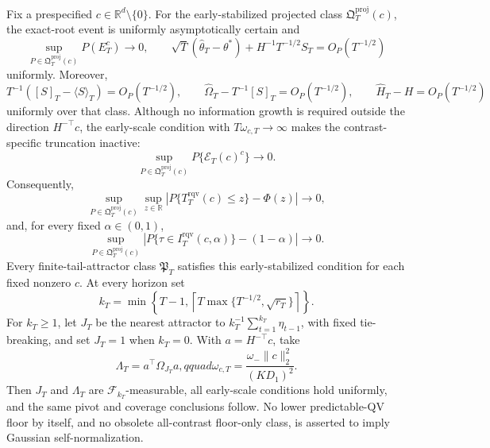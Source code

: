 Fix a prespecified \(c\in\mathbb R^d\setminus\{0\}\). For the early-stabilized projected class \(\mathfrak Q_T^{\mathrm{proj}}(c)\), the exact-root event is uniformly asymptotically certain and
\[
 \sup_{P\in\mathfrak Q_T^{\mathrm{proj}}(c)}P(E_T^c)\longrightarrow0,
 \qquad
 \sqrt T(\widehat\theta_T-\theta^*)+H^{-1}T^{-1/2}S_T
 =O_P(T^{-1/2})
\]
uniformly. Moreover,
\[
 T^{-1}([S]_T-\langle S\rangle_T)=O_P(T^{-1/2}),\qquad
 \widehat\Omega_T-T^{-1}[S]_T=O_P(T^{-1/2}),\qquad
 \widehat H_T-H=O_P(T^{-1/2})
\]
uniformly over that class. Although no information growth is required outside the direction \(H^{-\top}c\), the early-scale condition with \(T\omega_{c,T}\to\infty\) makes the contrast-specific truncation inactive:
\[
 \sup_{P\in\mathfrak Q_T^{\mathrm{proj}}(c)}P\{\mathcal E_T(c)^c\}
 \longrightarrow0.
\]
Consequently,
\[
 \sup_{P\in\mathfrak Q_T^{\mathrm{proj}}(c)}\sup_{z\in\mathbb R}
 \left|P\{T_T^{\mathrm{rqv}}(c)\le z\}-\Phi(z)\right|
 \longrightarrow0,
\]
and, for every fixed \(\alpha\in(0,1)\),
\[
 \sup_{P\in\mathfrak Q_T^{\mathrm{proj}}(c)}
 \left|P\{\tau\in I_T^{\mathrm{rqv}}(c,\alpha)\}-(1-\alpha)\right|
 \longrightarrow0.
\]
Every finite-tail-attractor class \(\mathfrak P_T\) satisfies this early-stabilized condition for each fixed nonzero \(c\). At every horizon set
\[
 k_T=\min\!\left\{T-1,\left\lceil T\max\{T^{-1/2},\sqrt{r_T}\}\right\rceil\right\}.
\]
For \(k_T\ge1\), let \(J_T\) be the nearest attractor to \(k_T^{-1}\sum_{t=1}^{k_T}\eta_{t-1}\), with fixed tie-breaking, and set \(J_T=1\) when \(k_T=0\). With \(a=H^{-\top}c\), take
\[
 \Lambda_T=a^\top\Omega_{J_T}a,qquad
 \omega_{c,T}=\frac{\omega_-\|c\|_2^2}{(KD_1)^2}.
\]
Then \(J_T\) and \(\Lambda_T\) are \(\mathcal F_{k_T}\)-measurable, all early-scale conditions hold uniformly, and the same pivot and coverage conclusions follow. No lower predictable-QV floor by itself, and no obsolete all-contrast floor-only class, is asserted to imply Gaussian self-normalization.